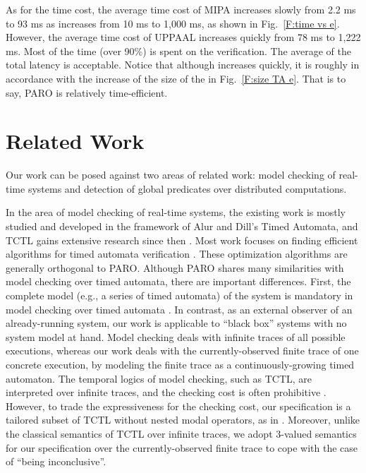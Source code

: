 \documentclass[10pt,conference,compsocconf,letterpaper]{IEEEtran}
\begin{document}
As for the time cost, the average time cost of MIPA  increases slowly from 2.2 ms to 93 ms as  increases from 10 ms to 1,000 ms, as shown in Fig.~\ref{F:time vs e}. However, the average time cost of UPPAAL  increases quickly from 78 ms to 1,222 ms. Most of the time (over 90\%) is spent on the verification. The average of the total latency is acceptable. Notice that although  increases quickly, it is roughly in accordance with the increase of the size of the  in Fig.~\ref{F:size TA e}. That is to say, \textsf{PARO} is relatively time-efficient.

\section{Related Work} \label{sec:Related work}

Our work can be posed against two areas of related work: model checking of real-time systems and detection of global predicates over distributed computations.

In the area of model checking of real-time systems, the existing work is mostly studied and developed in the framework of Alur and Dill's Timed Automata, and TCTL gains extensive research since then \cite{Baier08, Alur93, Alur94}. Most work focuses on finding efficient algorithms for timed automata verification \cite{Baier08, Dill89, Laroussinie04, Wang04}. These optimization algorithms are generally orthogonal to \textsf{PARO}. Although \textsf{PARO} shares many similarities with model checking over timed automata, there are important differences. First, the complete model (e.g., a series of timed automata) of the system is mandatory in model checking over timed automata \cite{Baier08, Alur93, Alur94}. In contrast, as an external observer of an already-running system, our work is applicable to ``black box'' systems with no system model at hand. Model checking deals with infinite traces of all possible executions, whereas our work deals with the currently-observed finite trace of one concrete execution, by modeling the finite trace as a continuously-growing timed automaton. The temporal logics of model checking, such as TCTL, are interpreted over infinite traces, and the checking cost is often prohibitive \cite{Baier08}. However, to trade the expressiveness for the checking cost, our specification is a tailored subset of TCTL without nested modal operators, as in \cite{Behrmann04}. Moreover, unlike the classical semantics of TCTL over infinite traces, we adopt 3-valued semantics for our specification over the currently-observed finite trace to cope with the case of ``being inconclusive''.
\end{document}
